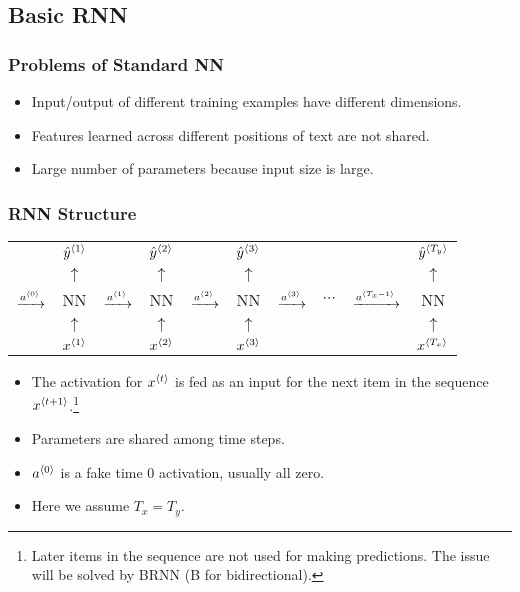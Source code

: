 \subsection{Basic RNN}
\subsubsection{Problems of Standard NN}
\begin{itemize}
  \item Input/output of different training examples have different dimensions.
  \item Features learned across different positions of text are not shared.
  \item Large number of parameters because input size is large.
\end{itemize}
\subsubsection{RNN Structure}
\begin{center}
  \begin{tabular}{cccccccccc}
    & $\hat{y}^{\left\langle 1\right\rangle}$ & & $\hat{y}^{\left\langle 2\right\rangle}$ & & $\hat{y}^{\left\langle 3\right\rangle}$ & & & & $\hat{y}^{\left\langle T_y\right\rangle}$\\
    & $\uparrow$ & & $\uparrow$ & & $\uparrow$ & & & & $\uparrow$\\ 
    $\xrightarrow{a^{\left\langle 0\right\rangle}}$& NN & $\xrightarrow{a^{\left\langle 1\right\rangle}}$ & NN & $\xrightarrow{a^{\left\langle 2\right\rangle}}$ & NN & $\xrightarrow{a^{\left\langle 3\right\rangle}}$ & $\cdots$ & $\xrightarrow{a^{\left\langle T_x-1\right\rangle}}$ & NN \\ 
    & $\uparrow$ & & $\uparrow$ & & $\uparrow$ & & & & $\uparrow$\\ 
    & $x^{\left\langle 1\right\rangle}$ & & $x^{\left\langle 2\right\rangle}$ & & $x^{\left\langle 3\right\rangle}$ & & & & $x^{\left\langle T_x\right\rangle}$\\
  \end{tabular}
\end{center}
\begin{itemize}
  \item The activation for $x^{\left\langle t\right\rangle}$ is fed as an input for the next item in the sequence $x^{\left\langle t+1\right\rangle}$.\footnote{Later items in the sequence are not used for making predictions. The issue will be solved by BRNN (B for bidirectional).}
  \item Parameters are shared among time steps.
  \item $a^{\left\langle 0\right\rangle}$ is a fake time 0 activation, usually all zero.
  \item Here we assume $T_x=T_y$. 
  \end{itemize}
